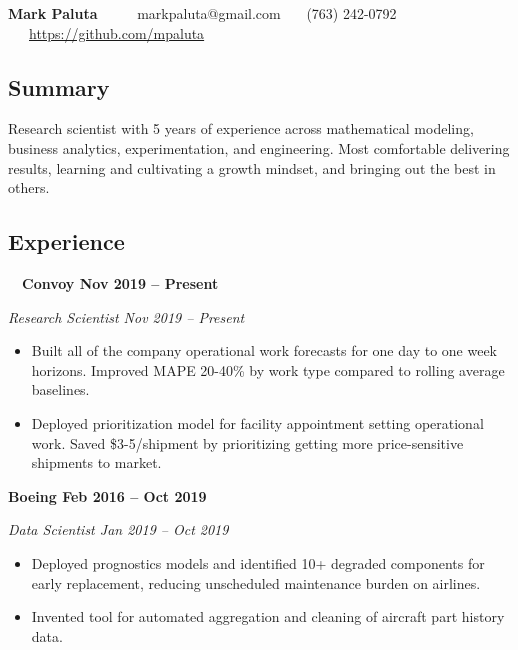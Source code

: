 \documentclass[10pt,letterpaper]{article}
\begin{document}
    \begin{center}
    {\LARGE \textbf{Mark Paluta}} \ \ \ \ \
    markpaluta@gmail.com \ \textbullet \ \ (763) 242-0792 \ \textbullet \ \ \href{https://github.com/mpaluta}{https://github.com/mpaluta}
    \end{center}

\subsection*{Summary}

    \begin{adjustwidth}{1.25em}{}
        Research scientist with 5 years of experience across mathematical modeling, business analytics, experimentation, and engineering. Most comfortable delivering results, learning and cultivating a growth mindset, and bringing out the best in others.
    \end{adjustwidth}

\subsection*{Experience}

    \quad \ \ \textbf{Convoy \hfill Nov 2019 – Present}

        \quad \emph{Research Scientist \hfill Nov 2019 – Present}

            \begin{itemize}[label={--}, leftmargin=.5in, labelindent=16pt, topsep=1pt]
                \setlength\itemsep{-.25em}
            	\item Built all of the company operational work forecasts for one day to one week horizons. Improved MAPE 20-40\% by work type compared to rolling average baselines.
            	\item Deployed prioritization model for facility appointment setting operational work. Saved \$3-5/shipment by prioritizing getting more price-sensitive shipments to market.
            \end{itemize}

    \textbf{Boeing \hfill Feb 2016 – Oct 2019}

        \quad \emph{Data Scientist \hfill Jan 2019 – Oct 2019}

            \begin{itemize}[label={--}, leftmargin=.5in, labelindent=16pt, topsep=1pt]
                \setlength\itemsep{-.25em}
            	\item Deployed prognostics models and identified 10+ degraded components for early replacement, reducing unscheduled maintenance burden on airlines.
            	\item Invented tool for automated aggregation and cleaning of aircraft part history data.
            \end{itemize}
\end{document}
